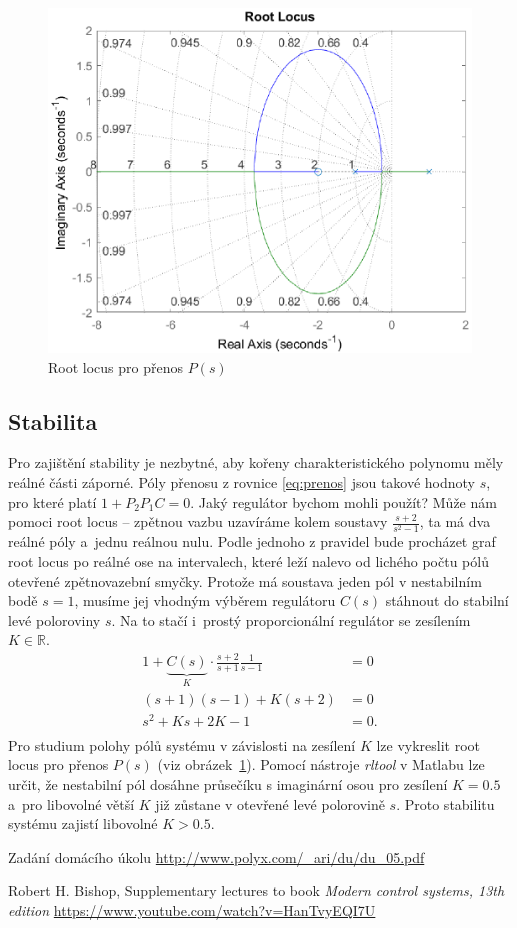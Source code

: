 \documentclass[twoside]{article}
\begin{document}
\begin{figure}[H]
	\centering
	\includegraphics{rl.eps}
	\caption{Root locus pro přenos $P(s)$}
	\label{fig:rl}
\end{figure}

\subsection{Stabilita}
Pro zajištění stability je nezbytné, aby kořeny charakteristického polynomu měly reálné části záporné.
Póly přenosu z rovnice \eqref{eq:prenos} jsou takové hodnoty $s$, pro které platí $1 + P_2 P_1 C = 0$.
Jaký regulátor bychom mohli použít? Může nám pomoci root locus -- zpětnou vazbu uzavíráme kolem
soustavy $\frac{s+2}{s^2 - 1}$, ta má dva reálné póly a~jednu reálnou nulu. Podle jednoho z pravidel
bude procházet graf root locus po reálné ose na intervalech, které leží nalevo od lichého počtu pólů otevřené
zpětnovazební smyčky. Protože má soustava jeden pól v nestabilním bodě $s = 1$, musíme jej vhodným výběrem regulátoru $C(s)$ stáhnout
do stabilní levé poloroviny $s$. Na to stačí i~prostý proporcionální regulátor se zesílením $K \in \mathbb{R}$.
\begin{equation}
	\begin{split}
		1 + \underbrace{C(s)}_{K} \cdot \frac{s+2}{s+1} \frac{1}{s-1} &= 0 \\
		(s+1)(s-1) + K(s+2) &= 0 \\
		s^2 +K s +2K-1 &= 0. \\
	\end{split}
\end{equation}
Pro studium polohy pólů systému v závislosti na zesílení $K$ lze vykreslit root locus pro přenos $P(s)$ (viz obrázek~\ref{fig:rl}).
Pomocí nástroje \textit{rltool} v Matlabu lze určit, že nestabilní pól dosáhne průsečíku s imaginární osou
pro zesílení $K = 0.5$ a~pro libovolné větší $K$ již zůstane v otevřené levé polorovině $s$. Proto stabilitu systému zajistí libovolné $K > 0.5$.


\begin{thebibliography}{9}

	 Zadání domácího úkolu \url{http://www.polyx.com/_ari/du/du_05.pdf}

	Robert H. Bishop, Supplementary lectures to book \emph{Modern control systems, 13th edition} \url{https://www.youtube.com/watch?v=HanTvyEQI7U}

\end{thebibliography}
\end{document}
